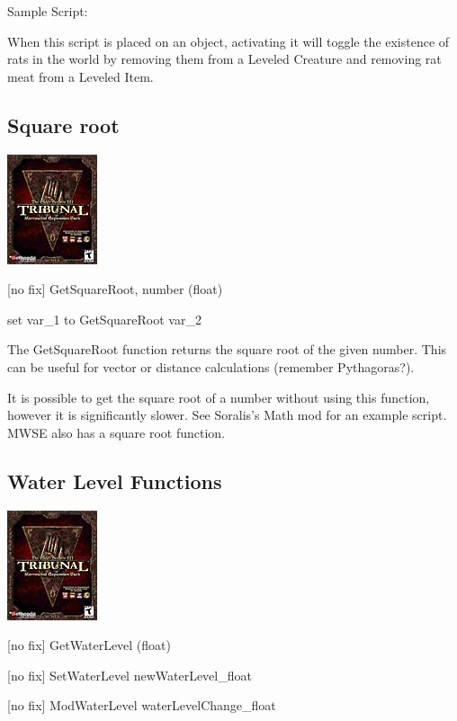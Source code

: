 Sample Script:

When this script is placed on an object, activating it will toggle the
existence of rats in the world by removing them from a Leveled Creature
and removing rat meat from a Leveled Item.



\hypertarget{square-root}{%
\subsection{Square root}\label{square-root}}

\includegraphics{media/image6.png}

{[}no fix{]} GetSquareRoot, number (float)

set var\_1 to GetSquareRoot var\_2

The GetSquareRoot function returns the square root of the given number.
This can be useful for vector or distance calculations (remember
Pythagoras?).

It is possible to get the square root of a number without using this
function, however it is significantly slower. See Soralis's Math mod for
an example script. MWSE also has a square root function.

\hypertarget{water-level-functions}{%
\subsection{Water Level Functions}\label{water-level-functions}}

\includegraphics{media/image6.png}

{[}no fix{]} GetWaterLevel (float)

{[}no fix{]} SetWaterLevel newWaterLevel\_float

{[}no fix{]} ModWaterLevel waterLevelChange\_float

